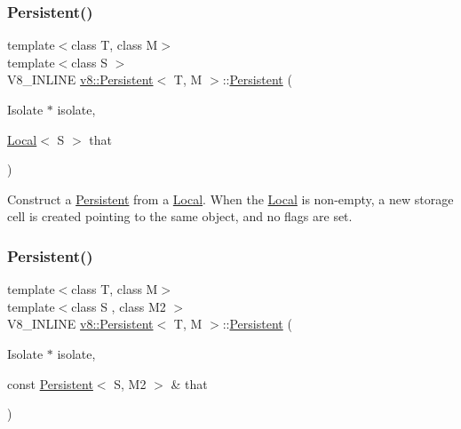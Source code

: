 \subsubsection{\texorpdfstring{Persistent()}{Persistent()}\hspace{0.1cm}{\footnotesize\ttfamily [2/4]}}
{\footnotesize\ttfamily template$<$class T, class M$>$ \\
template$<$class S $>$ \\
V8\+\_\+\+I\+N\+L\+I\+NE \mbox{\hyperlink{classv8_1_1Persistent}{v8\+::\+Persistent}}$<$ T, M $>$\+::\mbox{\hyperlink{classv8_1_1Persistent}{Persistent}} (\begin{DoxyParamCaption}\item[{Isolate $\ast$}]{isolate,  }\item[{\mbox{\hyperlink{classv8_1_1Local}{Local}}$<$ S $>$}]{that }\end{DoxyParamCaption})\hspace{0.3cm}{\ttfamily [inline]}}

Construct a \mbox{\hyperlink{classv8_1_1Persistent}{Persistent}} from a \mbox{\hyperlink{classv8_1_1Local}{Local}}. When the \mbox{\hyperlink{classv8_1_1Local}{Local}} is non-\/empty, a new storage cell is created pointing to the same object, and no flags are set. \mbox{\label{classv8_1_1Persistent_aaf9eb7c4e6d0ef2c81a2c08238653578}} 
\subsubsection{\texorpdfstring{Persistent()}{Persistent()}\hspace{0.1cm}{\footnotesize\ttfamily [3/4]}}
{\footnotesize\ttfamily template$<$class T, class M$>$ \\
template$<$class S , class M2 $>$ \\
V8\+\_\+\+I\+N\+L\+I\+NE \mbox{\hyperlink{classv8_1_1Persistent}{v8\+::\+Persistent}}$<$ T, M $>$\+::\mbox{\hyperlink{classv8_1_1Persistent}{Persistent}} (\begin{DoxyParamCaption}\item[{Isolate $\ast$}]{isolate,  }\item[{const \mbox{\hyperlink{classv8_1_1Persistent}{Persistent}}$<$ S, M2 $>$ \&}]{that }\end{DoxyParamCaption})\hspace{0.3cm}{\ttfamily [inline]}}

